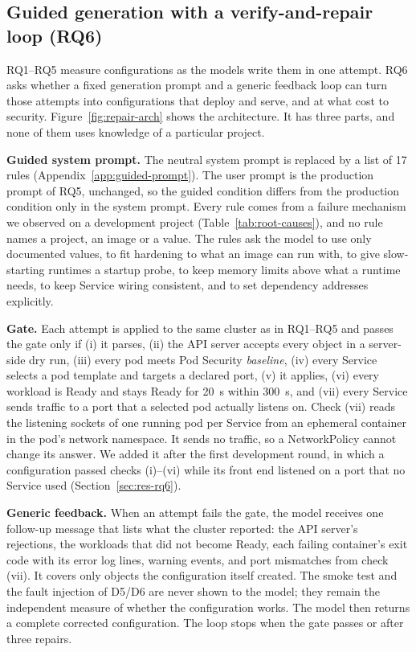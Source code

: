 
\subsection{Guided generation with a verify-and-repair loop (RQ6)}\label{sec:method-repair}

RQ1--RQ5 measure configurations as the models write them in one attempt. RQ6 asks whether a fixed generation prompt and a generic feedback loop can turn those attempts into configurations that deploy and serve, and at what cost to security. Figure~\ref{fig:repair-arch} shows the architecture. It has three parts, and none of them uses knowledge of a particular project.

\textbf{Guided system prompt.} The neutral system prompt is replaced by a list of 17 rules (Appendix~\ref{app:guided-prompt}). The user prompt is the production prompt of RQ5, unchanged, so the guided condition differs from the production condition only in the system prompt. Every rule comes from a failure mechanism we observed on a development project (Table~\ref{tab:root-causes}), and no rule names a project, an image or a value. The rules ask the model to use only documented values, to fit hardening to what an image can run with, to give slow-starting runtimes a startup probe, to keep memory limits above what a runtime needs, to keep Service wiring consistent, and to set dependency addresses explicitly.

\textbf{Gate.} Each attempt is applied to the same cluster as in RQ1--RQ5 and passes the gate only if (i) it parses, (ii) the API server accepts every object in a server-side dry run, (iii) every pod meets Pod Security \emph{baseline}, (iv) every Service selects a pod template and targets a declared port, (v) it applies, (vi) every workload is Ready and stays Ready for 20~s within 300~s, and (vii) every Service sends traffic to a port that a selected pod actually listens on. Check (vii) reads the listening sockets of one running pod per Service from an ephemeral container in the pod's network namespace. It sends no traffic, so a NetworkPolicy cannot change its answer. We added it after the first development round, in which a configuration passed checks (i)--(vi) while its front end listened on a port that no Service used (Section~\ref{sec:res-rq6}).

\textbf{Generic feedback.} When an attempt fails the gate, the model receives one follow-up message that lists what the cluster reported: the API server's rejections, the workloads that did not become Ready, each failing container's exit code with its error log lines, warning events, and port mismatches from check (vii). It covers only objects the configuration itself created. The smoke test and the fault injection of D5/D6 are never shown to the model; they remain the independent measure of whether the configuration works. The model then returns a complete corrected configuration. The loop stops when the gate passes or after three repairs.

